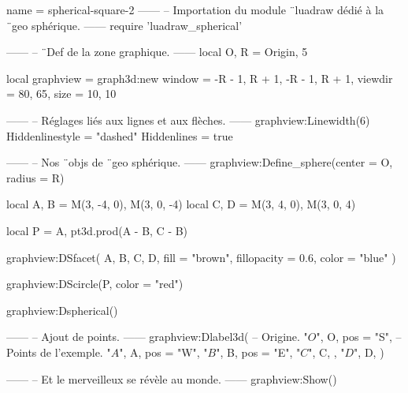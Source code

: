 \documentclass{standalone}
\begin{document}
\begin{luadraw}{name = spherical-square-2}
------
-- Importation du module ¨luadraw dédié à la ¨geo sphérique.
------
require 'luadraw_spherical'

------
-- ¨Def de la zone graphique.
------
local O, R = Origin, 5

local graphview = graph3d:new{
  window  = {-R - 1, R + 1, -R - 1, R + 1},
  viewdir = {80, 65},
  size    = {10, 10}
}

------
-- Réglages liés aux lignes et aux flèches.
------
graphview:Linewidth(6)
Hiddenlinestyle = "dashed"
Hiddenlines     = true

------
-- Nos ¨objs de ¨geo sphérique.
------
graphview:Define_sphere({center = O, radius = R})

local A, B = M(3, -4, 0), M(3, 0, -4)
local C, D = M(3, 4, 0), M(3, 0, 4)

local P = {A, pt3d.prod(A - B, C - B)}

graphview:DSfacet(
  {A, B, C, D},
  {fill = "brown", fillopacity = 0.6, color = "blue"}
)

graphview:DScircle(P, {color = "red"})

graphview:Dspherical()

------
-- Ajout de points.
------
graphview:Dlabel3d(
-- Origine.
  "$O$", O, {pos = "S"},
-- Points de l'exemple.
  "$A$", A, {pos = "W"},
  "$B$", B, {pos = "E"},
  "$C$", C, {},
  "$D$", D, {}
)

------
-- Et le merveilleux se révèle au monde.
------
graphview:Show()
\end{luadraw}
\end{document}
